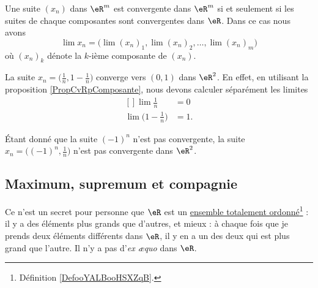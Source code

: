 \begin{proposition}		\label{PropCvRpComposante}
	Une suite $(x_n)$ dans $\eR^m$ est convergente dans $\eR^m$ si et seulement si les suites de chaque composantes sont convergentes dans $\eR$. Dans ce cas nous avons
	 \begin{equation}
		 \lim x_n=\Big( \lim(x_n)_1,\lim (x_n)_2,\ldots,\lim (x_n)_m \Big)
	 \end{equation}
	 où $(x_n)_k$ dénote la $k$-ième composante de $(x_n)$.
\end{proposition}

\begin{example}
	La suite $x_n=\big( \frac{1}{ n },1-\frac{1}{ n } \big)$ converge vers $(0,1)$ dans $\eR^2$. En effet, en utilisant la proposition \ref{PropCvRpComposante}, nous devons calculer séparément les limites
	\begin{equation}
		\begin{aligned}[]
			\lim\frac{1}{ n }&=0\\
			\lim\big( 1-\frac{1}{ n } \big)&=1.
		\end{aligned}
	\end{equation}
\end{example}

\begin{example}
	Étant donné que la suite $(-1)^n$ n'est pas convergente, la suite $x_n=\big( (-1)^n,\frac{1}{ n } \big)$ n'est pas convergente dans $\eR^2$.
\end{example}

\subsection{Maximum, supremum et compagnie}

Ce n'est un secret pour personne que $\eR$ est un \href{http://fr.wikipedia.org/wiki/Relation_d'ordre}{ensemble totalement ordonné}\footnote{Définition \ref{DefooYALBooHSXZqB}.} : il y a des éléments plus grands que d'autres, et mieux : à chaque fois que je prends deux éléments différents dans $\eR$, il y en a un des deux qui est plus grand que l'autre. Il n'y a pas d'\emph{ex æquo} dans $\eR$.

